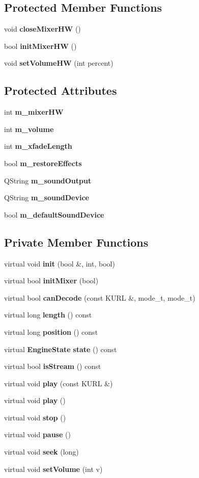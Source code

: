 \subsection*{Protected Member Functions}
\begin{CompactItemize}
\item 
void {\bf close\-Mixer\-HW} ()
\item 
bool {\bf init\-Mixer\-HW} ()
\item 
void {\bf set\-Volume\-HW} (int percent)
\end{CompactItemize}
\subsection*{Protected Attributes}
\begin{CompactItemize}
\item 
int {\bf m\_\-mixer\-HW}
\item 
int {\bf m\_\-volume}
\item 
int {\bf m\_\-xfade\-Length}
\item 
bool {\bf m\_\-restore\-Effects}
\item 
QString {\bf m\_\-sound\-Output}
\item 
QString {\bf m\_\-sound\-Device}
\item 
bool {\bf m\_\-default\-Sound\-Device}
\end{CompactItemize}
\subsection*{Private Member Functions}
\begin{CompactItemize}
\item 
virtual void {\bf init} (bool \&, int, bool)
\item 
virtual bool {\bf init\-Mixer} (bool)
\item 
virtual bool {\bf can\-Decode} (const KURL \&, mode\_\-t, mode\_\-t)
\item 
virtual long {\bf length} () const 
\item 
virtual long {\bf position} () const 
\item 
virtual {\bf Engine\-State} {\bf state} () const 
\item 
virtual bool {\bf is\-Stream} () const 
\item 
virtual void {\bf play} (const KURL \&)
\item 
virtual void {\bf play} ()
\item 
virtual void {\bf stop} ()
\item 
virtual void {\bf pause} ()
\item 
virtual void {\bf seek} (long)
\item 
virtual void {\bf set\-Volume} (int v)
\end{CompactItemize}


